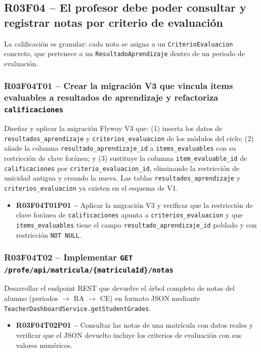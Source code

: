 \documentclass[12pt, a4paper]{report}
\begin{document}
\subsection{R03F04 -- El profesor debe poder consultar y registrar notas por criterio de evaluación}

La calificación es granular: cada nota se asigna a un \texttt{CriterioEvaluacion} concreto, que pertenece a un \texttt{ResultadoAprendizaje} dentro de un periodo de evaluación.

\subsubsection{R03F04T01 -- Crear la migración V3 que vincula ítems evaluables a resultados de aprendizaje y refactoriza \texttt{calificaciones}}
Diseñar y aplicar la migración Flyway V3 que: (1) inserta los datos de \texttt{resultados\_aprendizaje} y \texttt{criterios\_evaluacion} de los módulos del ciclo; (2) añade la columna \texttt{resultado\_aprendizaje\_id} a \texttt{items\_evaluables} con su restricción de clave foránea; y (3) sustituye la columna \texttt{item\_evaluable\_id} de \texttt{calificaciones} por \texttt{criterio\_evaluacion\_id}, eliminando la restricción de unicidad antigua y creando la nueva. Las tablas \texttt{resultados\_aprendizaje} y \texttt{criterios\_evaluacion} ya existen en el esquema de V1.
\begin{itemize}
  \item \textbf{R03F04T01P01 --} Aplicar la migración V3 y verificar que la restricción de clave foránea de \texttt{calificaciones} apunta a \texttt{criterios\_evaluacion} y que \texttt{items\_evaluables} tiene el campo \texttt{resultado\_aprendizaje\_id} poblado y con restricción \texttt{NOT NULL}.
\end{itemize}

\subsubsection{R03F04T02 -- Implementar \texttt{GET /profe/api/matricula/\{matriculaId\}/notas}}
Desarrollar el endpoint REST que devuelve el árbol completo de notas del alumno (periodos \(\rightarrow\) RA \(\rightarrow\) CE) en formato JSON mediante \texttt{TeacherDashboardService.getStudentGrades}.
\begin{itemize}
  \item \textbf{R03F04T02P01 --} Consultar las notas de una matrícula con datos reales y verificar que el JSON devuelto incluye los criterios de evaluación con sus valores numéricos.
\end{itemize}
\end{document}
